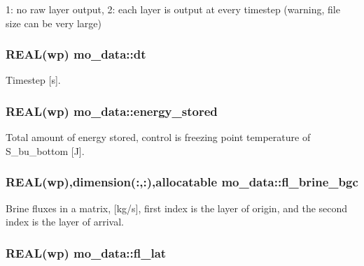 1: no raw layer output, 2: each layer is output at every timestep (warning, file size can be very large) 

\hypertarget{namespacemo__data_a6dedf87b47bcdf4151797c04485f251e}{
\subsubsection[{dt}]{\setlength{\rightskip}{0pt plus 5cm}REAL(wp) {\bf mo\_\-data::dt}}}
\label{namespacemo__data_a6dedf87b47bcdf4151797c04485f251e}


Timestep \mbox{[}s\mbox{]}. 

\hypertarget{namespacemo__data_aedd9ec4adc59bfcbf90402c4226f2f34}{
\subsubsection[{energy\_\-stored}]{\setlength{\rightskip}{0pt plus 5cm}REAL(wp) {\bf mo\_\-data::energy\_\-stored}}}
\label{namespacemo__data_aedd9ec4adc59bfcbf90402c4226f2f34}


Total amount of energy stored, control is freezing point temperature of S\_\-bu\_\-bottom \mbox{[}J\mbox{]}. 

\hypertarget{namespacemo__data_a5fbc3eddb21dfefcbd20b3f95b2e9808}{
\subsubsection[{fl\_\-brine\_\-bgc}]{\setlength{\rightskip}{0pt plus 5cm}REAL(wp),dimension(:,:),allocatable {\bf mo\_\-data::fl\_\-brine\_\-bgc}}}
\label{namespacemo__data_a5fbc3eddb21dfefcbd20b3f95b2e9808}


Brine fluxes in a matrix, \mbox{[}kg/s\mbox{]}, first index is the layer of origin, and the second index is the layer of arrival. 

\hypertarget{namespacemo__data_a63a4e3f74d04640c4f4522a9f22390e0}{
\subsubsection[{fl\_\-lat}]{\setlength{\rightskip}{0pt plus 5cm}REAL(wp) {\bf mo\_\-data::fl\_\-lat}}}
\label{namespacemo__data_a63a4e3f74d04640c4f4522a9f22390e0}


